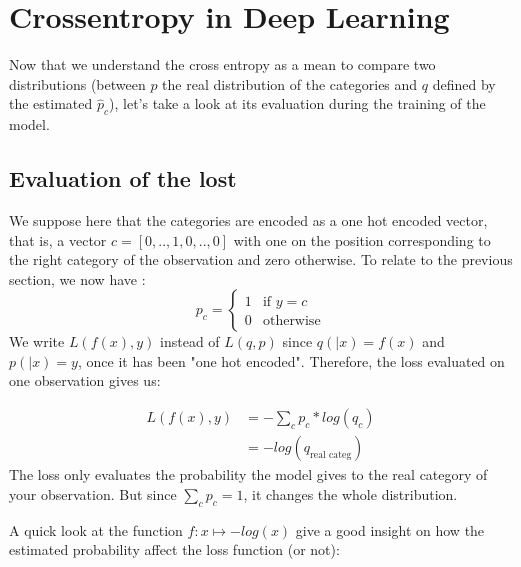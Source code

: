 \documentclass[11pt]{article}
\begin{document}
\section{Crossentropy in Deep Learning}

Now that we understand the cross entropy as a mean to compare two distributions (between $p$ the real distribution of the categories and $q$ defined by the estimated $\hat{p}_c$), let's take a look at its evaluation during the training of the model.

\subsection{Evaluation of the lost}
We suppose here that the categories are encoded as a one hot encoded vector, that is,
a vector $c = [0,..,1,0,..,0]$ with one on the position corresponding to the right category of the observation and zero otherwise. To relate to the previous section, we now have :
$$
p_c = \left\{
    \begin{array}{ll}
        1 & \mbox{if }  y = c \\
        0 & \mbox{otherwise}
    \end{array}
\right.
$$
We write ${L(f(x) , y) }$ instead of ${L(q,p)}$ since $q(|x) = f(x)$ and $ p(|x) = y$, once it has been "one hot encoded". Therefore, the loss evaluated on one observation gives us:
\begin{equation}
\end{equation}

\begin{equation} \label{eq1}
\begin{split}
    {L(f(x) , y) } & = - \sum_c p_c * log( q_c)\\
     & =  - log( q_{\text{real categ}})
\end{split}
\end{equation}
The loss only evaluates the probability the model gives to the real category of your observation. But since $\sum_c p_c = 1 $, it changes the whole distribution. \par
A quick look at the function $f : x \mapsto - log(x) $ give a good insight on how the estimated probability affect the loss function (or not): 
\end{document}
